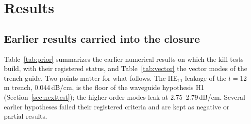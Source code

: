 \documentclass[11pt,a4paper]{article}
\newcommand{\dBcm}{\,dB/cm\xspace}
\newcommand{\um}{\,\textmu m\xspace}
\begin{document}
\section{Results}
\label{sec:results}

\subsection{Earlier results carried into the closure}
\label{sec:prior}

Table~\ref{tab:prior} summarizes the earlier numerical results on which the kill tests build, with their registered status, and Table~\ref{tab:vector} the vector modes of the trench guide. Two points matter for what follows. The HE$_{11}$ leakage of the $t=12$\um trench, 0.044\dBcm, is the floor of the waveguide hypothesis H1 (Section~\ref{sec:nexttest}); the higher-order modes leak at 2.75--2.79\dBcm. Several earlier hypotheses failed their registered criteria and are kept as negative or partial results.
\end{document}
